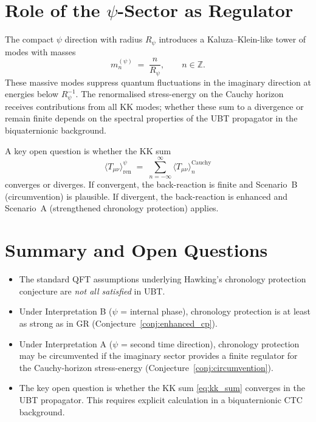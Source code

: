 \documentclass[12pt]{article}
\begin{document}
\section{Role of the $\psi$-Sector as Regulator}
The compact $\psi$ direction with radius $R_\psi$ introduces a
Kaluza–Klein-like tower of modes with masses
\begin{equation}
  m_n^{(\psi)} \;=\; \frac{n}{R_\psi}, \qquad n \in \mathbb{Z}.
  \label{eq:kk_masses}
\end{equation}
These massive modes suppress quantum fluctuations in the imaginary direction
at energies below $R_\psi^{-1}$.  The renormalised stress-energy on the
Cauchy horizon receives contributions from all KK modes; whether these
sum to a divergence or remain finite depends on the spectral properties
of the UBT propagator in the biquaternionic background.

A key open question is whether the KK sum
\begin{equation}
  \langle T_{\mu\nu}\rangle_{\mathrm{ren}}^{\psi} \;=\;
  \sum_{n=-\infty}^{\infty}
  \langle T_{\mu\nu}\rangle_n^{\mathrm{Cauchy}}
  \label{eq:kk_sum}
\end{equation}
converges or diverges.  If convergent, the back-reaction is finite and
Scenario~B (circumvention) is plausible.  If divergent, the back-reaction
is enhanced and Scenario~A (strengthened chronology protection) applies.

\section{Summary and Open Questions}
\begin{itemize}
  \item The standard QFT assumptions underlying Hawking's chronology
    protection conjecture are \emph{not all satisfied} in UBT.
  \item Under Interpretation B ($\psi$ = internal phase), chronology
    protection is at least as strong as in GR (Conjecture~\ref{conj:enhanced_cp}).
  \item Under Interpretation A ($\psi$ = second time direction),
    chronology protection may be circumvented if the imaginary sector
    provides a finite regulator for the Cauchy-horizon stress-energy
    (Conjecture~\ref{conj:circumvention}).
  \item The key open question is whether the KK sum \eqref{eq:kk_sum}
    converges in the UBT propagator.  This requires explicit calculation
    in a biquaternionic CTC background.
\end{itemize}
\end{document}

